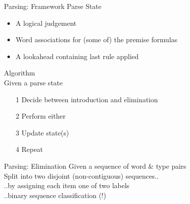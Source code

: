 \documentclass{beamer}
\begin{document}
\begin{frame}{Parsing: Framework}
\alert{Parse State}
\begin{itemize}
	\item A logical judgement
	\item Word associations for (some of) the premise formulas
	\item A lookahead containing last rule applied
\end{itemize}

\alert{Algorithm}\\
Given a parse state
\begin{itemize}
\item[1] Decide between introduction and elimination
\item[2] Perform either
\item[3] Update state(s)
\item[4] Repeat
\end{itemize}
\end{frame}

\begin{frame}{Parsing: Elimination}
Given a sequence of word \& type pairs \\ 
\quad Split into two disjoint (non-contiguous) sequences.. \\
\pause
\quad ..by assigning each item one of two labels \\ 
\quad ..\alert{binary sequence classification} (!)
\end{frame}
\end{document}
